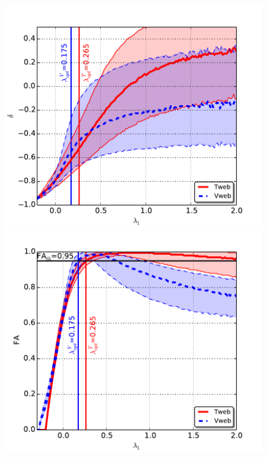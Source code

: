 \documentclass[a4,useAMS,usenatbib,usegraphicx]{mn2e}
\begin{document}
\begin{figure}
\centering

  \includegraphics[trim = 1mm 0mm 5mm 10mm, clip, keepaspectratio=true,
  width=0.35\textheight]{delta_L1.pdf}  
  \includegraphics[trim = 1mm 0mm 5mm 10mm, clip, keepaspectratio=true,
  width=0.35\textheight]{FA_L1.pdf}

\end{figure}
\end{document}
